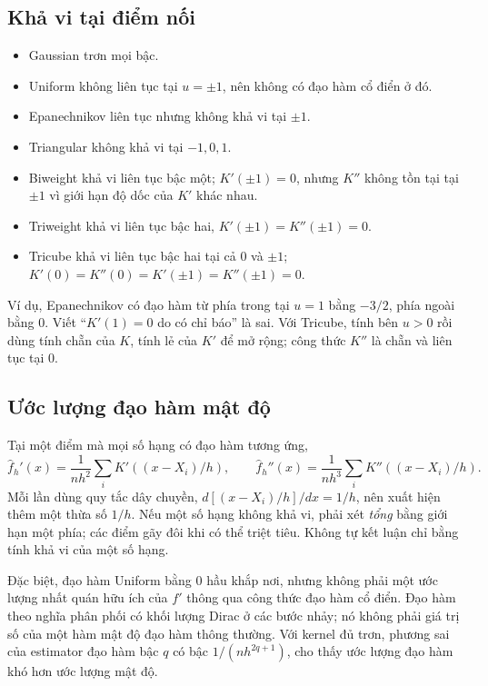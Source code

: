 \subsection{Khả vi tại điểm nối}
\begin{itemize}
\item Gaussian trơn mọi bậc.
\item Uniform không liên tục tại $u=\pm1$, nên không có đạo hàm cổ điển ở đó.
\item Epanechnikov liên tục nhưng không khả vi tại $\pm1$.
\item Triangular không khả vi tại $-1,0,1$.
\item Biweight khả vi liên tục bậc một; $K'(\pm1)=0$, nhưng $K''$
  không tồn tại tại $\pm1$ vì giới hạn độ dốc của $K'$ khác nhau.
\item Triweight khả vi liên tục bậc hai, $K'(\pm1)=K''(\pm1)=0$.
\item Tricube khả vi liên tục bậc hai tại cả $0$ và $\pm1$;
  $K'(0)=K''(0)=K'(\pm1)=K''(\pm1)=0$.
\end{itemize}
Ví dụ, Epanechnikov có đạo hàm từ phía trong tại $u=1$ bằng $-3/2$,
phía ngoài bằng 0. Viết ``$K'(1)=0$ do có chỉ báo'' là sai.
Với Tricube, tính bên $u>0$ rồi dùng tính chẵn của $K$, tính lẻ của
$K'$ để mở rộng; công thức $K''$ là chẵn và liên tục tại 0.

\subsection{Ước lượng đạo hàm mật độ}
Tại một điểm mà mọi số hạng có đạo hàm tương ứng,
\[
\boxed{\widehat f_h'(x)=\frac1{nh^2}\sum_iK'((x-X_i)/h),\qquad
\widehat f_h''(x)=\frac1{nh^3}\sum_iK''((x-X_i)/h).}
\]
Mỗi lần dùng quy tắc dây chuyền, $d[(x-X_i)/h]/dx=1/h$,
nên xuất hiện thêm một thừa số $1/h$.
Nếu một số hạng không khả vi, phải xét \emph{tổng} bằng giới hạn một
phía; các điểm gãy đôi khi có thể triệt tiêu. Không tự kết luận chỉ bằng
tính khả vi của một số hạng.

Đặc biệt, đạo hàm Uniform bằng 0 hầu khắp nơi, nhưng không phải một
ước lượng nhất quán hữu ích của $f'$ thông qua công thức đạo hàm cổ điển.
Đạo hàm theo nghĩa phân phối có khối lượng Dirac ở các bước nhảy;
nó không phải giá trị số của một hàm mật độ đạo hàm thông thường.
Với kernel đủ trơn, phương sai của estimator đạo hàm bậc $q$ có bậc
$1/(nh^{2q+1})$, cho thấy ước lượng đạo hàm khó hơn ước lượng mật độ.


